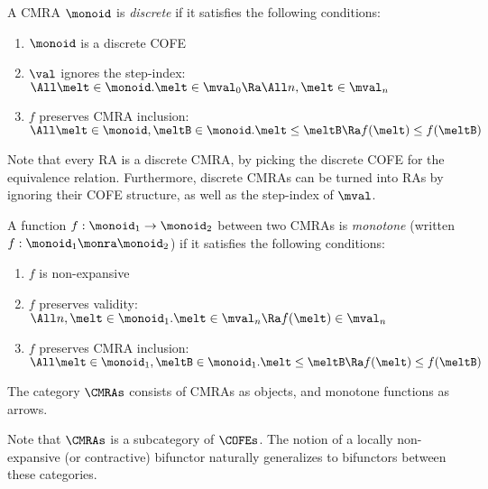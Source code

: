\begin{defn}
  A CMRA $\monoid$ is \emph{discrete} if it satisfies the following conditions:
  \begin{enumerate}[itemsep=0pt]
  \item $\monoid$ is a discrete COFE
  \item $\val$ ignores the step-index: \\
    $\All \melt \in \monoid. \melt \in \mval_0 \Ra \All n, \melt \in \mval_n$
  \item $f$ preserves CMRA inclusion:\\
    $\All \melt \in \monoid, \meltB \in \monoid. \melt \leq \meltB \Ra f(\melt) \leq f(\meltB)$
  \end{enumerate}
\end{defn}
Note that every RA is a discrete CMRA, by picking the discrete COFE for the equivalence relation.
Furthermore, discrete CMRAs can be turned into RAs by ignoring their COFE structure, as well as the step-index of $\mval$.

\begin{defn}
  A function $f : \monoid_1 \to \monoid_2$ between two CMRAs is \emph{monotone} (written $f : \monoid_1 \monra \monoid_2$) if it satisfies the following conditions:
  \begin{enumerate}[itemsep=0pt]
  \item $f$ is non-expansive
  \item $f$ preserves validity: \\
    $\All n, \melt \in \monoid_1. \melt \in \mval_n \Ra f(\melt) \in \mval_n$
  \item $f$ preserves CMRA inclusion:\\
    $\All \melt \in \monoid_1, \meltB \in \monoid_1. \melt \leq \meltB \Ra f(\melt) \leq f(\meltB)$
  \end{enumerate}
\end{defn}

\begin{defn}
  The category $\CMRAs$ consists of CMRAs as objects, and monotone functions as arrows.
\end{defn}
Note that $\CMRAs$ is a subcategory of $\COFEs$.
The notion of a locally non-expansive (or contractive) bifunctor naturally generalizes to bifunctors between these categories.



